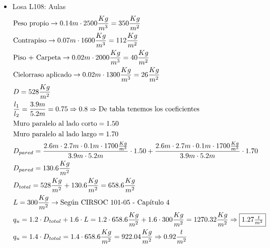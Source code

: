 \begin{enumerate}
\begin{itemize}
\item Losa L108: Aulas
\begin{align*}
& \text{Peso propio} \rightarrow 0.14m \cdot 2500 \frac{Kg}{m^3} = 350 \frac{Kg}{m^2}\\
& \text{Contrapiso} \rightarrow 0.07m \cdot 1600 \frac{Kg}{m^3} = 112 \frac{Kg}{m^2}\\
& \text{Piso + Carpeta} \rightarrow 0.02m \cdot 2000 \frac{Kg}{m^3} = 40 \frac{Kg}{m^2}\\
& \text{Cielorraso aplicado} \rightarrow  0.02m \cdot 1300 \frac{Kg}{m^3} = 26 \frac{Kg}{m^2}\\
& D = 528 \frac{Kg}{m^2}\\
& \frac{l_1}{l_2} = \frac{3.9m}{5.2m} = 0.75 \Rightarrow 0.8 \Rightarrow \text{De tabla tenemos los coeficientes} \\
& \text{Muro paralelo al lado corto} = 1.50 \\
& \text{Muro paralelo al lado largo} = 1.70 \\
& D_{pared} = \frac{2.6m \cdot 2.7m \cdot 0.1m \cdot 1700\frac{Kg}{m^3}}{3.9m \cdot 5.2m} \cdot 1.50 + \frac{2.6m \cdot 2.7m \cdot 0.1m \cdot 1700\frac{Kg}{m^3}}{3.9m \cdot 5.2m} \cdot 1.70 \\
& D_{pared} = 130.6 \frac{Kg}{m^2} \\
& D_{total} = 528 \frac{Kg}{m^2} + 130.6 \frac{Kg}{m^2} = 658.6 \frac{Kg}{m^2}\\
& L = 300 \frac{Kg}{m^2} \rightarrow \text{Según CIRSOC 101-05 - Capítulo 4}\\
& q_u = 1.2 \cdot D_{total} + 1.6 \cdot L = 1.2 \cdot 658.6 \frac{Kg}{m^2} + 1.6 \cdot 300 \frac{Kg}{m^2} = 1270.32 \frac{Kg}{m^2} \Rightarrow \framebox{$1.27 \frac{t}{m^2}$} \\
& q_u = 1.4 \cdot D_{total} = 1.4 \cdot 658.6 \frac{Kg}{m^2} = 922.04 \frac{Kg}{m^2} \Rightarrow 0.92 \frac{t}{m^2}
\end{align*}


\end{itemize}
\end{enumerate}
